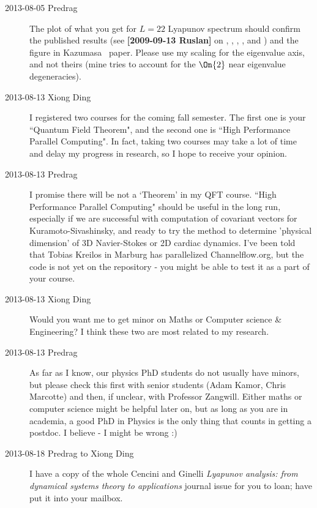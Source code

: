 \begin{description}
\item[2013-08-05 Predrag]
The plot of what you get for $L=22$
Lyapunov spectrum should confirm the published results (see
{\bf [2009-09-13 Ruslan]} on ,
, ,
, and ) and the
figure in Kazumasa \etal\
paper. Please use my scaling for the eigenvalue
axis, and not theirs (mine tries to account for the $\On{2}$
near eigenvalue degeneracies).

\item[2013-08-13 Xiong Ding] I registered two courses for the coming fall
semester. The first one is your ``Quantum Field Theorem", and the second
one is ``High Performance Parallel Computing". In fact, taking two courses
may take a lot of time and delay my progress in research, so I hope to
receive your opinion.

\item[2013-08-13 Predrag]
I promise there will be not a `Theorem' in my QFT course. ``High
Performance Parallel Computing" should be useful in the long run,
especially if we are successful with computation of covariant vectors for
Kuramoto-Sivashinsky, and ready to try the method to determine 'physical
dimension' of 3D Navier-Stokes or 2D cardiac dynamics. I've been told
that Tobias Kreilos in Marburg has parallelized Channelflow.org, but the
code is not yet on the repository - you might be able to test it as a
part of your course.

\item[2013-08-13 Xiong Ding] Would you want me to get minor on Maths or
Computer science \& Engineering? I think these two are most related to my
research.

\item[2013-08-13 Predrag]
As far as I know, our physics PhD students do not usually have minors,
but please check this first with senior students (Adam Kamor, Chris Marcotte)
and then, if unclear, with Professor Zangwill.  Either maths or computer
science might be helpful later on, but as long as you are in academia, a
good PhD in Physics is the only thing that counts in getting a postdoc. I
believe - I might be wrong :)

\item[2013-08-18 Predrag to Xiong Ding]
I have a copy of the whole Cencini and Ginelli
{\em Lyapunov analysis: from dynamical systems theory to applications} journal
issue for you to loan; have put it into your mailbox.


\end{description}
